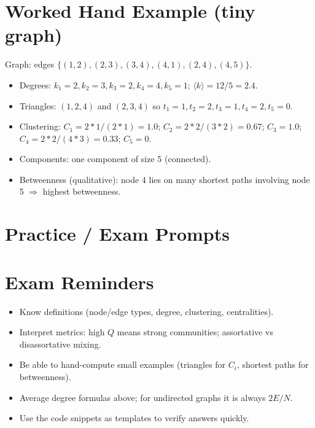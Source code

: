 \section{Worked Hand Example (tiny graph)}
Graph: edges $\{(1,2),(2,3),(3,4),(4,1),(2,4),(4,5)\}$.
\begin{itemize}
    \item Degrees: $k_1=2, k_2=3, k_3=2, k_4=4, k_5=1$; $\langle k\rangle=12/5=2.4$.
    \item Triangles: $(1,2,4)$ and $(2,3,4)$ so $t_1=1, t_2=2, t_3=1, t_4=2, t_5=0$.
    \item Clustering: $C_1=2*1/(2*1)=1.0$; $C_2=2*2/(3*2)=0.67$; $C_3=1.0$; $C_4=2*2/(4*3)=0.33$; $C_5=0$.
    \item Components: one component of size 5 (connected).
    \item Betweenness (qualitative): node 4 lies on many shortest paths involving node 5 $\Rightarrow$ highest betweenness.
\end{itemize}

\section{Practice / Exam Prompts}

\section{Exam Reminders}
\begin{itemize}
    \item Know definitions (node/edge types, degree, clustering, centralities).
    \item Interpret metrics: high $Q$ means strong communities; assortative vs disassortative mixing.
    \item Be able to hand-compute small examples (triangles for $C_i$, shortest paths for betweenness).
    \item Average degree formulas above; for undirected graphs it is always $2E/N$.
    \item Use the code snippets as templates to verify answers quickly.
\end{itemize}
